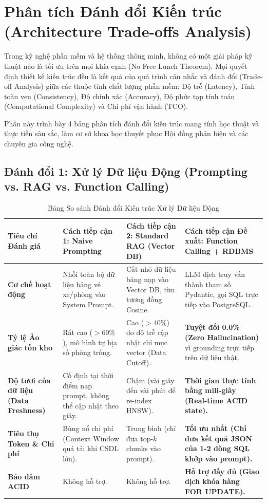 \section{Phân tích Đánh đổi Kiến trúc (Architecture Trade-offs Analysis)}
\label{sec:architecture_trade_offs}

Trong kỹ nghệ phần mềm và hệ thống thông minh, không có một giải pháp kỹ thuật nào là tối ưu trên mọi khía cạnh (No Free Lunch Theorem). Mọi quyết định thiết kế kiến trúc đều là kết quả của quá trình cân nhắc và đánh đổi (Trade-off Analysis) giữa các thuộc tính chất lượng phần mềm: Độ trễ (Latency), Tính toàn vẹn (Consistency), Độ chính xác (Accuracy), Độ phức tạp tính toán (Computational Complexity) và Chi phí vận hành (TCO).

Phần này trình bày 4 bảng phân tích đánh đổi kiến trúc mang tính học thuật và thực tiễn sâu sắc, làm cơ sở khoa học thuyết phục Hội đồng phản biện và các chuyên gia công nghệ.

\subsection{Đánh đổi 1: Xử lý Dữ liệu Động (Prompting vs. RAG vs. Function Calling)}
\label{subsec:tradeoff_dynamic_data}

\begin{table}[h!]
\centering
\small
\begin{tabular}{|p{3.2cm}|p{3.8cm}|p{3.8cm}|p{4.2cm}|}
\hline
\textbf{Tiêu chí Đánh giá} & \textbf{Cách tiếp cận 1: Naive Prompting} & \textbf{Cách tiếp cận 2: Standard RAG (Vector DB)} & \textbf{Cách tiếp cận Đề xuất: Function Calling + RDBMS} \\
\hline
\textbf{Cơ chế hoạt động} & Nhồi toàn bộ dữ liệu bảng vé xe/phòng vào System Prompt. & Cắt nhỏ dữ liệu bảng nạp vào Vector DB, tìm tương đồng Cosine. & LLM dịch truy vấn thành tham số Pydantic, gọi SQL trực tiếp vào PostgreSQL. \\
\hline
\textbf{Tỷ lệ Ảo giác tồn kho} & Rất cao ($> 60\%$), mô hình tự bịa số phòng trống. & Cao ($> 40\%$) do độ trễ cập nhật chỉ mục vector (Data Cutoff). & \textbf{Tuyệt đối 0.0\% (Zero Hallucination)} vì grounding trực tiếp trên dữ liệu thật. \\
\hline
\textbf{Độ tươi của dữ liệu (Data Freshness)} & Cố định tại thời điểm nạp prompt, không thể cập nhật theo giây. & Chậm (vài giây đến vài phút để re-index HNSW). & \textbf{Thời gian thực tính bằng mili-giây (Real-time ACID state).} \\
\hline
\textbf{Tiêu thụ Token \& Chi phí} & Bùng nổ chi phí (Context Window quá tải khi CSDL lớn). & Trung bình (chỉ đưa top-$k$ chunks vào prompt). & \textbf{Tối ưu nhất (Chỉ đưa kết quả JSON của 1-2 dòng SQL khớp vào prompt).} \\
\hline
\textbf{Bảo đảm ACID} & Không hỗ trợ. & Không hỗ trợ. & \textbf{Hỗ trợ đầy đủ (Giao dịch khóa hàng FOR UPDATE).} \\
\hline
\end{tabular}
\caption{Bảng So sánh Đánh đổi Kiến trúc Xử lý Dữ liệu Động}
\label{tab:tradeoff_dynamic_data}
\end{table}

